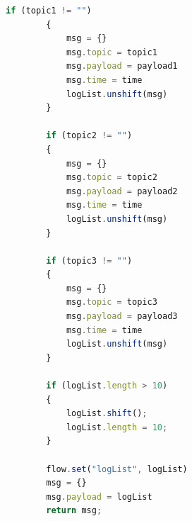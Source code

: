 \documentclass{report}
\begin{document}
\begin{enumerate}
\begin{lstlisting}[language=JavaScript, caption={function of control log list}]
        if (topic1 != "")
        {
            msg = {}
            msg.topic = topic1
            msg.payload = payload1
            msg.time = time
            logList.unshift(msg)
        }

        if (topic2 != "") 
        {
            msg = {}
            msg.topic = topic2
            msg.payload = payload2
            msg.time = time
            logList.unshift(msg)
        }

        if (topic3 != "") 
        {
            msg = {}
            msg.topic = topic3
            msg.payload = payload3
            msg.time = time
            logList.unshift(msg)
        }

        if (logList.length > 10) 
        {
            logList.shift();
            logList.length = 10;
        }

        flow.set("logList", logList)
        msg = {}
        msg.payload = logList
        return msg;
    \end{lstlisting}
\end{enumerate}

\newpage
\end{document}
